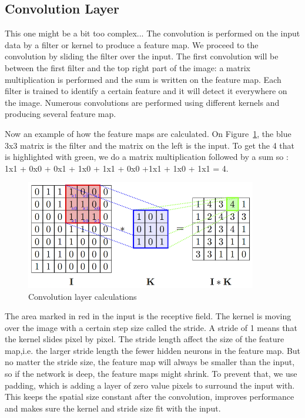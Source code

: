 \subsection{Convolution Layer}
This one might be a bit too complex...
The convolution is performed on the input data by a filter or kernel to produce a feature map. We proceed to the convolution by sliding the filter over the input. The first convolution will be between the first filter and the top right part of the image: a matrix multiplication is performed and the sum is written on the feature map. Each filter is trained to identify a certain feature and it will detect it everywhere on the image.  Numerous convolutions are performed using different kernels and producing several feature map.
	
	Now an example of how the feature maps are calculated. On Figure~\ref{fig:conv_layer}, the blue 3x3 matrix is the filter and the matrix on the left is the input. To get the 4 that is highlighted with green, we do a matrix multiplication followed by a sum so : 1x1 + 0x0 + 0x1 + 1x0 + 1x1 + 0x0 +1x1 + 1x0 + 1x1 = 4. 
	\begin{figure}[!htp]
    \centering
        \includegraphics[width=0.9\textwidth]{./figures/02-conv_layer}
        \caption{Convolution layer calculations}\label{fig:conv_layer}
    \end{figure}
    
	The area marked  in  red in the input is the receptive field. The kernel is moving over the image with a certain step size called the stride. A stride of 1 means that the kernel slides pixel by pixel. The stride length affect the size of the feature map,i.e. the larger stride length the fewer hidden neurons in the feature map. But no matter the stride size, the feature map will always be smaller than the input, so if the network is deep, the feature maps might shrink. To prevent that, we use padding, which is adding a layer of zero value pixels to surround the input with. This keeps the spatial size constant after the convolution, improves performance and makes sure the kernel and stride size fit with the input. 


